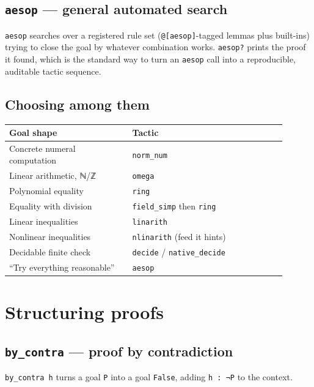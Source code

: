 \subsection{\texttt{aesop} --- general automated search}

\texttt{aesop} searches over a registered rule set (\texttt{@[aesop]}-tagged lemmas plus built-ins) trying to close the goal by whatever combination works. \texttt{aesop?} prints the proof it found, which is the standard way to turn an \texttt{aesop} call into a reproducible, auditable tactic sequence.

\subsection{Choosing among them}

\begin{center}
\begin{tabular}{@{}p{0.40\linewidth}p{0.50\linewidth}@{}}
\hline
\textbf{Goal shape} & \textbf{Tactic} \\
\hline
Concrete numeral computation & \texttt{norm\_num} \\
Linear arithmetic, ℕ/ℤ & \texttt{omega} \\
Polynomial equality & \texttt{ring} \\
Equality with division & \texttt{field\_simp} then \texttt{ring} \\
Linear inequalities & \texttt{linarith} \\
Nonlinear inequalities & \texttt{nlinarith} (feed it hints) \\
Decidable finite check & \texttt{decide} / \texttt{native\_decide} \\
``Try everything reasonable'' & \texttt{aesop} \\
\hline
\end{tabular}
\end{center}

\section{Structuring proofs}

\subsection{\texttt{by\_contra} --- proof by contradiction}

\texttt{by\_contra h} turns a goal \texttt{P} into a goal \texttt{False}, adding \texttt{h : ¬P} to the context.

